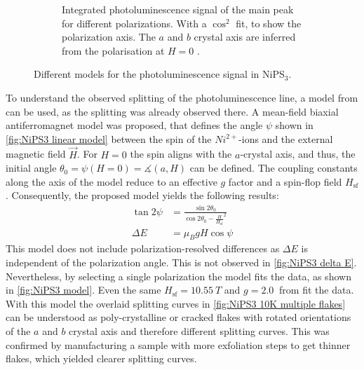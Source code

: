 \documentclass[
	oneside,
	parskip=half,
	a4paper,
]{scrbook}
\begin{document}
\begin{figure}
\begin{subfigure}[t]{3in}
		\caption{
			Integrated photoluminescence signal of the main peak for different polarizations. 
			With a $\cos^2$ fit, to show the polarization axis. 
			The $a$ and $b$ crystal axis are inferred from the polarisation at $H=0$ \cite{NiPS3_linear}.
		}
		\label{fig:NiPS3 polarisation peanut}
	\end{subfigure}
	\caption{Different models for the photoluminescence signal in NiPS$_3$.}
\end{figure}
To understand the observed splitting of the photoluminescence line, a model from \cite{NiPS3_magnon_gap} can be used, as the splitting was already observed there. 
A mean-field biaxial antiferromagnet model was proposed, that defines the angle $\psi$ shown in \autoref{fig:NiPS3 linear model} between the spin of the $Ni^{2+}$-ions and the external magnetic field $\vec{H}$.
For $H=0$ the spin aligns with the $a$-crystal axis, and thus, the initial angle $\theta_0=\psi\left(H=0\right)=\measuredangle(a, H)$ can be defined.
The coupling constants along the axis of the model reduce to an effective $g$ factor and a spin-flop field $H_\text{sf}$.
Consequently, the proposed model \autocite{NiPS3_magnon_gap} yields the following results:
\begin{align}
	\tan 2\psi &= \frac{\sin 2\theta_0}{\cos 2\theta_0 - \frac{H}{H_\text{sf}}^2}\\
	\Delta E &= \mu_B g H \cos \psi
	\label{eq:NiPS3 model}
\end{align}
This model does not include polarization-resolved differences as $\Delta E$ is independent of the polarization angle.
This is not observed in \autoref{fig:NiPS3 delta E}.
Nevertheless, by selecting a single polarization the model fits the data, as shown in \autoref{fig:NiPS3 model}.
Even the same $H_\text{sf} = \SI{10.55}{T}$ and $g=\SI{2.0}{}$ from \autocite{NiPS3_magnon_gap} fit the data.\\
With this model the overlaid splitting curves in \autoref{fig:NiPS3 10K multiple flakes} can be understood as poly-crystalline or cracked flakes with rotated orientations of the $a$ and $b$ crystal axis and therefore different splitting curves.
This was confirmed by manufacturing a sample with more exfoliation steps to get thinner flakes, which yielded clearer splitting curves.
\end{document}
